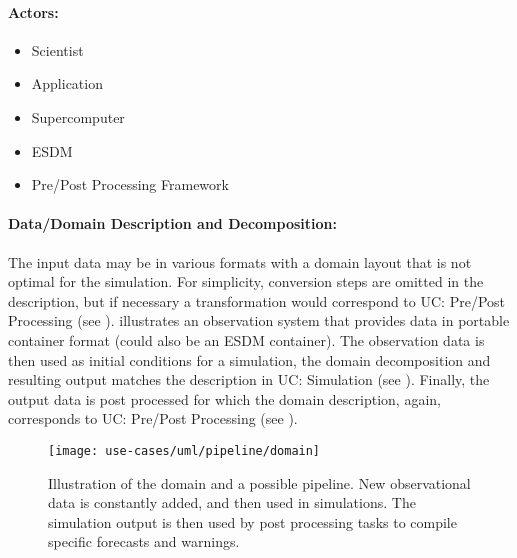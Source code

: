 \paragraph{Actors:}
\begin{itemize}
	\item Scientist
	\item Application
	\item Supercomputer
	\item ESDM
	\item Pre/Post Processing Framework
\end{itemize}


\paragraph{Data/Domain Description and Decomposition:}
The input data may be in various formats with a domain layout that is not optimal for the simulation.
For simplicity, conversion steps are omitted in the description, but if necessary a transformation would correspond to UC: Pre/Post Processing (see ).
 illustrates an observation system that provides data in portable container format (could also be an ESDM container).
The observation data is then used as initial conditions for a simulation, the domain decomposition and resulting output matches the description in UC: Simulation (see ).
Finally, the output data is post processed for which the domain description, again, corresponds to UC: Pre/Post Processing (see ).


\begin{figure}
	\centering
	\texttt{[image: use-cases/uml/pipeline/domain]}
	\caption{Illustration of the domain and a possible pipeline. New observational data is constantly added, and then used in simulations. The simulation output is then used by post processing tasks to compile specific forecasts and warnings.}
	\label{fig:domain workflow}
\end{figure}




